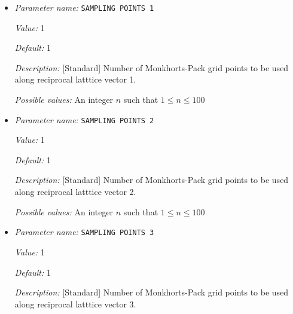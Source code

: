 \begin{itemize}
\item {\it Parameter name:} {\tt SAMPLING POINTS 1}
\label{parameters:Brillouin zone k point sampling options/Monkhorst_2dPack _28MP_29 grid generation/SAMPLING POINTS 1}
\label{parameters:Brillouin_20zone_20k_20point_20sampling_20options/Monkhorst_2dPack_20_28MP_29_20grid_20generation/SAMPLING_20POINTS_201}


{\it Value:} 1


{\it Default:} 1


{\it Description:} [Standard] Number of Monkhorts-Pack grid points to be used along reciprocal latttice vector 1.


{\it Possible values:} An integer $n$ such that $1\leq n \leq 100$
\item {\it Parameter name:} {\tt SAMPLING POINTS 2}
\label{parameters:Brillouin zone k point sampling options/Monkhorst_2dPack _28MP_29 grid generation/SAMPLING POINTS 2}
\label{parameters:Brillouin_20zone_20k_20point_20sampling_20options/Monkhorst_2dPack_20_28MP_29_20grid_20generation/SAMPLING_20POINTS_202}


{\it Value:} 1


{\it Default:} 1


{\it Description:} [Standard] Number of Monkhorts-Pack grid points to be used along reciprocal latttice vector 2.


{\it Possible values:} An integer $n$ such that $1\leq n \leq 100$
\item {\it Parameter name:} {\tt SAMPLING POINTS 3}
\label{parameters:Brillouin zone k point sampling options/Monkhorst_2dPack _28MP_29 grid generation/SAMPLING POINTS 3}
\label{parameters:Brillouin_20zone_20k_20point_20sampling_20options/Monkhorst_2dPack_20_28MP_29_20grid_20generation/SAMPLING_20POINTS_203}


{\it Value:} 1


{\it Default:} 1


{\it Description:} [Standard] Number of Monkhorts-Pack grid points to be used along reciprocal latttice vector 3.



\end{itemize}
